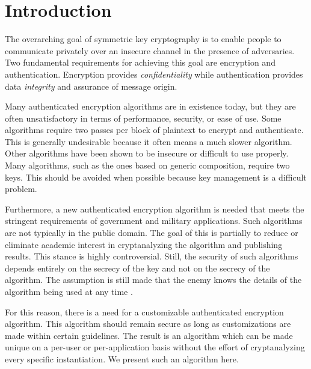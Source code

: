\section{Introduction}
The overarching goal of symmetric key cryptography is to enable people to communicate privately over an insecure channel in the presence of adversaries.
Two fundamental requirements for achieving this goal are encryption and authentication.
Encryption provides \emph{confidentiality} while authentication provides data \emph{integrity} and assurance of message origin.

Many authenticated encryption algorithms are in existence today, but they are often unsatisfactory in terms of performance, security, or ease of use.
Some algorithms require two passes per block of plaintext to encrypt and authenticate.
This is generally undesirable because it often means a much slower algorithm.
Other algorithms have been shown to be insecure or difficult to use properly.
Many algorithms, such as the ones based on generic composition, require two keys.
This should be avoided when possible because key management is a difficult problem.

Furthermore, a new authenticated encryption algorithm is needed that meets the stringent requirements of government and military applications.
Such algorithms are not typically in the public domain.
The goal of this is partially to reduce or eliminate academic interest in cryptanalyzing the algorithm and publishing results.
This stance is highly controversial.
Still, the security of such algorithms depends entirely on the secrecy of the key and not on the secrecy of the algorithm.
The assumption is still made that the enemy knows the details of the algorithm being used at any time \cite{Kurdziel2002_BaselineRequirements}.

For this reason, there is a need for a customizable authenticated encryption algorithm.
This algorithm should remain secure as long as customizations are made within certain guidelines.
The result is an algorithm which can be made unique on a per-user or per-application basis without the effort of cryptanalyzing every specific instantiation.
We present such an algorithm here.

